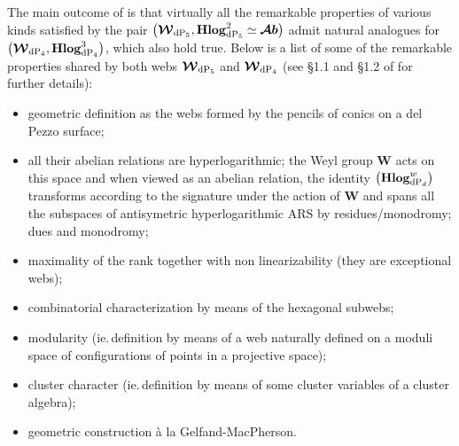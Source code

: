 \documentclass[11pt]{amsart}
\newcommand{\mk}{\medskip}
\begin{document}
The main outcome of \cite{PirioAFST}  is that virtually all the remarkable properties of various kinds  satisfied by the pair $\big( \boldsymbol{\mathcal W}_{ {\rm dP}_5 }, {\bf Hlog}^{2}_{ {\rm dP}_5}\simeq  \boldsymbol{\mathcal Ab}\big)$  
admit natural analogues for $\big( \boldsymbol{\mathcal W}_{ {\rm dP}_4 }, {\bf Hlog}^{3}_{ {\rm dP}_4}\big)$, 
which also hold true. Below is a list of some of the remarkable properties shared by both webs 
$\boldsymbol{\mathcal W}_{ {\rm dP}_5}$
and $\boldsymbol{\mathcal W}_{ {\rm dP}_4}$ (see  \S1.1 and \S1.2 of  \cite{PirioAFST} for further details): 
\begin{itemize}
\item geometric definition as the webs formed by the pencils of conics on a del Pezzo surface; 
\mk
\item all their abelian relations are hyperlogarithmic; the Weyl group 
$\boldsymbol{W}$ acts on this space and when viewed as an abelian relation, the identity $\big({\bf Hlog}^{w}_{ {\rm dP}_d}\big)$ transforms according to the  signature under the action of $\boldsymbol{W}$ and spans all the subspaces of antisymetric hyperlogarithmic ARS by residues/monodromy;
dues and monodromy;
\mk 
\item maximality of the rank together with non linearizability (they are exceptional webs);
\mk 
\item combinatorial characterization by means of the hexagonal subwebs;
\mk 
\item modularity (ie.\,definition by means of a web naturally defined on a moduli space of configurations of points in a projective space); 
\mk 
\item cluster character (ie.\,definition by means of some cluster variables of a cluster algebra); 
\mk 
\item geometric construction \`a la Gelfand-MacPherson.
\mk 
\end{itemize} 
\end{document}
